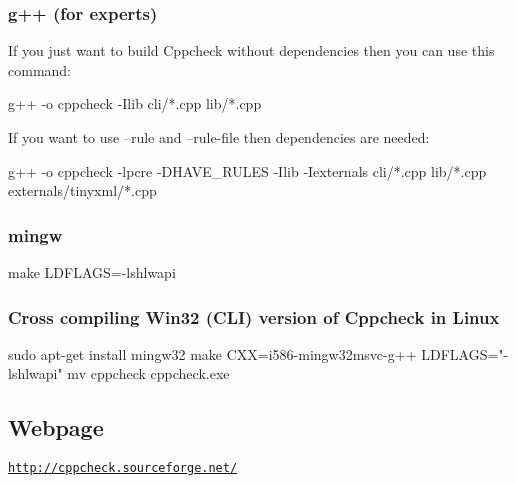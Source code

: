 \subsubsection*{g++ (for experts)}

If you just want to build Cppcheck without dependencies then you can use this command\-: \begin{DoxyVerb}g++ -o cppcheck -Ilib cli/*.cpp lib/*.cpp
\end{DoxyVerb}


If you want to use --rule and --rule-\/file then dependencies are needed\-: \begin{DoxyVerb}g++ -o cppcheck -lpcre -DHAVE_RULES -Ilib -Iexternals cli/*.cpp lib/*.cpp externals/tinyxml/*.cpp
\end{DoxyVerb}


\subsubsection*{mingw}

\begin{DoxyVerb}make LDFLAGS=-lshlwapi
\end{DoxyVerb}


\subsubsection*{Cross compiling Win32 (C\-L\-I) version of Cppcheck in Linux}

\begin{DoxyVerb}sudo apt-get install mingw32
make CXX=i586-mingw32msvc-g++ LDFLAGS="-lshlwapi"
mv cppcheck cppcheck.exe
\end{DoxyVerb}


\subsection*{Webpage}

\href{http://cppcheck.sourceforge.net/}{\tt http\-://cppcheck.\-sourceforge.\-net/} 
